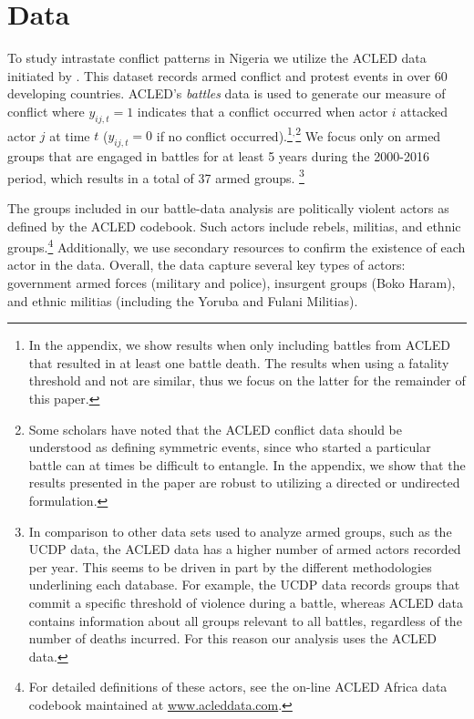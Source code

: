 \section*{Data}
To study intrastate conflict patterns in Nigeria we utilize the ACLED data initiated by \citet{raleigh:etal:2010}. This dataset records armed conflict and protest events in over 60 developing countries. ACLED's \textit{battles} data is used to generate our measure of conflict where $y_{ij,t} = 1$ indicates that a conflict occurred when actor $i$ attacked actor $j$ at time $t$ ($y_{ij,t} = 0$ if no conflict occurred).\footnote{In the appendix, we show results when only including battles from ACLED that resulted in at least one battle death. The results when using a fatality threshold and not are similar, thus we focus on the latter for the remainder of this paper.}$^{, }$\footnote{Some scholars have noted that the ACLED conflict data should be understood as defining symmetric events, since who started a particular battle can at times be difficult to entangle. In the appendix, we show that the results presented in the paper are robust to utilizing a directed or undirected formulation.}  We focus only on armed groups that are engaged in battles for at least 5 years during the 2000-2016 period, which results in a total of 37 armed groups. \footnote{In comparison to other data sets used to analyze armed groups, such as the UCDP data, the ACLED data has a higher number of armed actors recorded per year. This seems to be driven in part by the different methodologies underlining each database. For example, the UCDP data records groups that commit a specific threshold of violence during a battle, whereas ACLED data contains information about all groups relevant to all battles, regardless of the number of deaths incurred. For this reason our analysis uses the ACLED data.}

The groups included in our battle-data analysis are politically violent actors as defined by the ACLED codebook. Such actors include rebels, militias, and ethnic groups.\footnote{For detailed definitions of these actors, see the on-line ACLED Africa data codebook maintained at \url{www.acleddata.com}.} Additionally, we use secondary resources to confirm the existence of each actor in the data. Overall, the data capture several key types of actors: government armed forces (military and police), insurgent groups (Boko Haram), and ethnic militias (including the Yoruba and Fulani Militias). 

